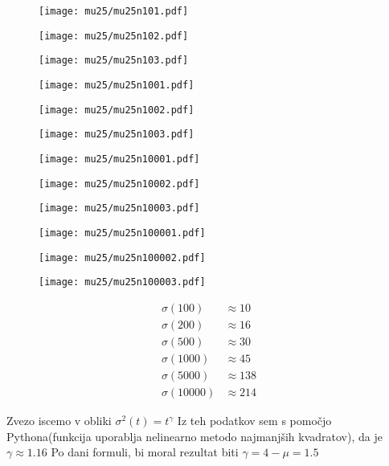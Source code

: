 \documentclass{article}
\begin{document}
\begin{figure}[H]
\texttt{[image: mu25/mu25n101.pdf]}
\end{figure}
\begin{figure}[H]
\texttt{[image: mu25/mu25n102.pdf]}
\end{figure}
\begin{figure}[H]
\texttt{[image: mu25/mu25n103.pdf]}
\end{figure}
\begin{figure}[H]
\texttt{[image: mu25/mu25n1001.pdf]}
\end{figure}
\begin{figure}[H]
\texttt{[image: mu25/mu25n1002.pdf]}
\end{figure}
\begin{figure}[H]
\texttt{[image: mu25/mu25n1003.pdf]}
\end{figure}
\begin{figure}[H]
\texttt{[image: mu25/mu25n10001.pdf]}
\end{figure}
\begin{figure}[H]
\texttt{[image: mu25/mu25n10002.pdf]}
\end{figure}
\begin{figure}[H]
\texttt{[image: mu25/mu25n10003.pdf]}
\end{figure}
\begin{figure}[H]
\texttt{[image: mu25/mu25n100001.pdf]}
\end{figure}
\begin{figure}[H]
\texttt{[image: mu25/mu25n100002.pdf]}
\end{figure}
\begin{figure}[H]
\texttt{[image: mu25/mu25n100003.pdf]}
\end{figure}

\begin{align*}
\sigma(100) &\approx 10 \\
\sigma(200) &\approx 16 \\
\sigma(500) &\approx 30 \\
\sigma(1000) &\approx 45 \\
\sigma(5000) &\approx 138 \\
\sigma(10000) &\approx 214
\end{align*}

Zvezo iscemo v obliki $\sigma^2(t)=t^\gamma$
Iz teh podatkov sem s pomočjo Pythona(funkcija uporablja nelinearno metodo najmanjših kvadratov), da je $\gamma \approx 1.16$
Po dani formuli, bi moral rezultat biti $\gamma = 4-\mu = 1.5$
\end{document}
